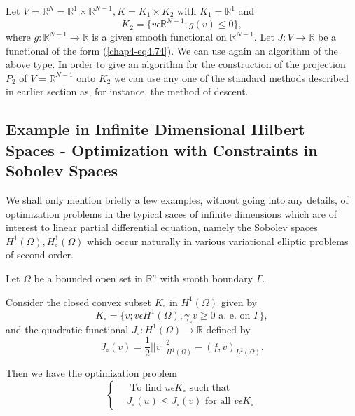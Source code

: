 \begin{example}\label{chap4-exam4.6}
Let $V = \mathbb{R}^{N} = \mathbb{R}^{1} \times \mathbb{R}^{N-1}, K = K_{1} \times K_{2}$ with $K_{1} = \mathbb{R}^{1}$ and
$$
K_{2} = \{v \epsilon \mathbb{R}^{N-1} ; g(v) \leq 0\},
$$
where $g : \mathbb{R}^{N-1} \to \mathbb{R}$ is a given smooth functional on $\mathbb{R}^{N-1}$. Let $J : V \to \mathbb{R}$ be a functional of the form (\ref{chap4-eq4.74}). We can use again an algorithm of the above type. In order to give an algorithm for the construction of the projection $P_{2}$ of $V = \mathbb{R}^{N-1}$ onto $K_{2}$ we can use any one of the standard methods described in earlier section as, for instance, the method of descent.
\end{example}

\subsection{Example in Infinite Dimensional Hilbert Spaces - Optimization with Constraints in Sobolev Spaces}\pageoriginale\label{chap4-subsec4.9}

We shall only mention briefly a few examples, without going into any details, of optimization problems in the typical saces of infinite dimensions which are of interest to linear partial differential equation, namely the Sobolev spaces $H^{1} (\Omega), H_{\circ}^{1} (\Omega)$ which occur naturally in various variational elliptic problems of second order.

\begin{example}\label{chap4-exam4.7}
Let $\Omega$ be a bounded open set in $\mathbb{R}^{n}$ with smoth boundary $\Gamma$.

Consider the closed convex subset $K_{\circ}$ in $H^{1}(\Omega)$ given by
\begin{equation*}
K_{\circ} = \{v ; v \epsilon H^{1} (\Omega), \gamma_{\circ} v \geq 0 \text{ a. e. on } \Gamma\},\tag{4.82}\label{chap4-eq4.82}
\end{equation*}
and the quadratic functional $J_{\circ} : H^{1} (\Omega) \to \mathbb{R}$ defined by
\begin{equation*}
J_{\circ} (v) = \frac{1}{2} ||v||_{H^{1} (\Omega)}^{2} -(f, v)_{L^{2} (\Omega)}.\tag{4.83}\label{chap4-eq4.83}
\end{equation*}

Then we have the optimization problem
\begin{equation*}
\begin{cases}
& \text{ To find } u \epsilon K_{\circ} \text{ such that }\\
& J_{\circ} (u) \leq J_{\circ} (v) \text{ for all } v \epsilon K_{\circ}\tag{4.84}\label{chap4-eq4.84}
\end{cases}
\end{equation*}
\end{example}


